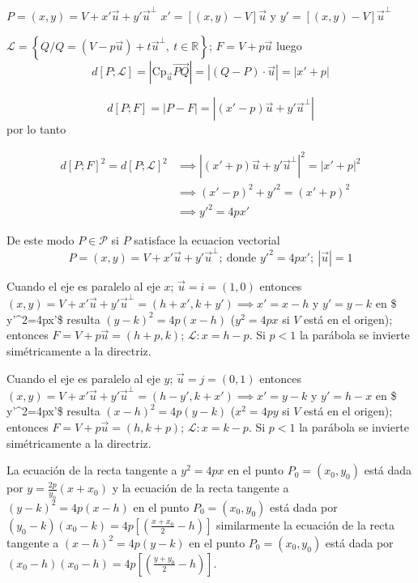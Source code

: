 \documentclass[12pt,]{report}
\theoremstyle{definition}
\theoremstyle{definition}
\theoremstyle{definition}
\theoremstyle{remark}
\begin{document}
\(P=(x,y)=V+x'\vec{u}+y'\vec{u}^\perp\) \(x'=[(x,y)-V]\vec{u}\) y \(y'=[(x,y)-V]\vec{u}^\perp\)

\(\mathcal{L}=\left\{Q/Q=(V-p\vec{u})+t\vec{u}^\perp,\:t\in \mathbb{R}\right\}\); \(F=V+p\vec{u}\) luego \[d[P;\mathcal{L}]=\left|\text{Cp}_{\vec{u}}\vec{PQ}\right|=\left|(Q-P)\cdot\vec{u}\right|=\left|x'+p\right|\]

\[d[P;F]=\left|P-F\right|=\left|(x'-p)\vec{u}+y'\vec{u}^\perp\right|\] por lo tanto

\begin{align*}
d\left[P;F\right]^2=d\left[P;\mathcal{L}\right]^2
& \implies \left|(x'+p)\vec{u}+y'\vec{u}^\perp\right|^2=\left|x'+p\right|^2 \\
&\implies (x'-p)^2+y'^2=(x'+p)^2\\
&\implies y'^2=4px'
\end{align*}

De este modo \(P\in\mathcal{P}\) si \(P\) satisface la ecuacion vectorial \[P=(x,y)=V+x'\vec{u}+y'\vec{u}^\perp;\: \text{donde } y'^2=4px'; \:\left|\vec{u}\right|=1\]

Cuando el eje es paralelo al eje \(x\); \(\vec{u}=i=(1,0)\) entonces \((x,y)=V+x'\vec{u}+y'\vec{u}^\perp=(h+x',k+y')\implies x'=x-h\) y \(y'=y-k\) en \$ y'\^{}2=4px'\$ resulta \((y-k)^2=4p(x-h)\) (\(y^2=4px\) si \(V\) está en el origen); entonces \(F=V+p\vec{u}=(h+p,k)\); \(\mathcal{L}: x=h-p\). Si \(p<1\) la parábola se invierte simétricamente a la directriz.

Cuando el eje es paralelo al eje \(y\); \(\vec{u}=j=(0,1)\) entonces \((x,y)=V+x'\vec{u}+y'\vec{u}^\perp=(h-y',k+x')\implies x'=y-k\) y \(y'=h-x\) en \$ y'\^{}2=4px'\$ resulta \((x-h)^2=4p(y-k)\) (\(x^2=4py\) si \(V\) está en el origen); entonces \(F=V+p\vec{u}=(h,k+p)\); \(\mathcal{L}: x=k-p\). Si \(p<1\) la parábola se invierte simétricamente a la directriz.

La ecuación de la recta tangente a \(y^2=4px\) en el punto \(P_0=(x_0,y_0)\) está dada por \(y=\frac{2p}{y_0}(x+x_0)\) y la ecuación de la recta tangente a \((y-k)^2=4p(x-h)\) en el punto \(P_0=(x_0,y_0)\) está dada por \((y_0-k)(x_0-k)=4p\left[\left(\frac{x+x_0}{2}-h\right)\right]\) similarmente la ecuación de la recta tangente a \((x-h)^2=4p(y-k)\) en el punto \(P_0=(x_0,y_0)\) está dada por \((x_0-h)(x_0-h)=4p\left[\left(\frac{y+y_0}{2}-h\right)\right]\).
\end{document}
